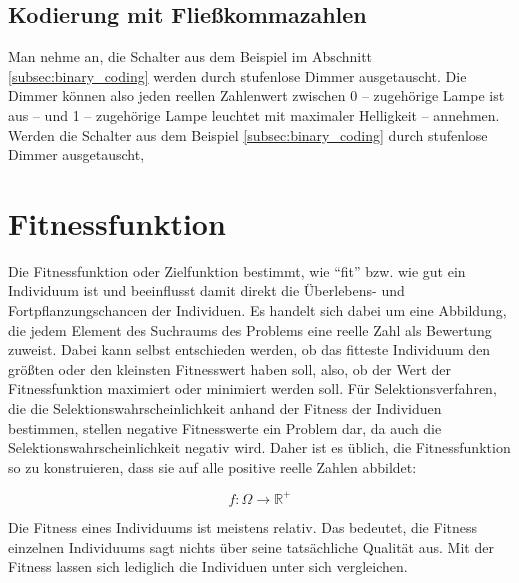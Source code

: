 \subsection{Kodierung mit Fließkommazahlen}
Man nehme an, die Schalter aus dem Beispiel im Abschnitt \ref{subsec:binary_coding} werden durch stufenlose Dimmer ausgetauscht. Die Dimmer können also jeden reellen Zahlenwert zwischen 0 -- zugehörige Lampe ist aus -- und 1 -- zugehörige Lampe leuchtet mit maximaler Helligkeit -- annehmen. 
Werden die Schalter aus dem Beispiel \ref{subsec:binary_coding} durch stufenlose Dimmer ausgetauscht, 

\section{Fitnessfunktion}
Die Fitnessfunktion oder Zielfunktion bestimmt, wie "`fit"' bzw. wie gut ein Individuum ist und beeinflusst damit direkt die Überlebens- und Fortpflanzungschancen der Individuen. Es handelt sich dabei um  eine Abbildung, die jedem Element des Suchraums des Problems eine reelle Zahl als Bewertung zuweist. Dabei kann selbst entschieden werden, ob das fitteste Individuum den größten oder den kleinsten Fitnesswert haben soll, also, ob der Wert der Fitnessfunktion maximiert oder minimiert werden soll. Für Selektionsverfahren, die die Selektionswahrscheinlichkeit anhand der Fitness der Individuen bestimmen, stellen negative Fitnesswerte ein Problem dar, da auch die Selektionswahrscheinlichkeit negativ wird. Daher ist es üblich, die Fitnessfunktion so zu konstruieren, dass sie auf alle positive reelle Zahlen abbildet:

\begin{equation}
f: \Omega \to \mathbb{R}^+
\end{equation}

Die Fitness eines Individuums ist meistens relativ. Das bedeutet, die Fitness einzelnen Individuums sagt nichts über seine tatsächliche Qualität aus. Mit der Fitness lassen sich lediglich die Individuen unter sich vergleichen. 



